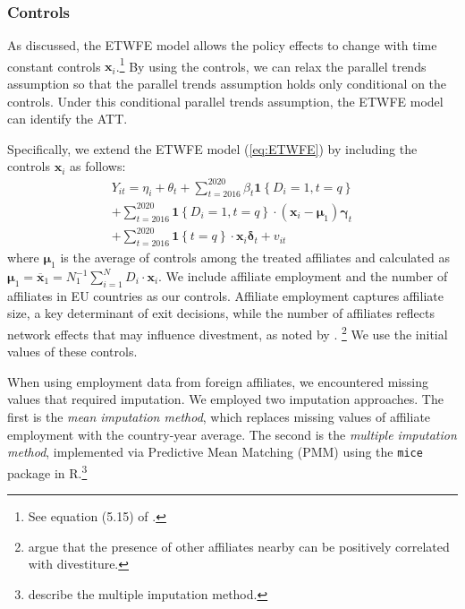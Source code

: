 \documentclass[preprint,11pt,authoryear]{elsarticle}
\begin{document}
{\renewcommand\normalsize{\scriptsize}%
\normalsize 

}




\subsubsection*{Controls}

As \cite{wooldridge2021two} discussed, the ETWFE model allows the policy effects to change with time constant controls $\mathbf{x}_{i}$.\footnote{See equation (5.15) of \cite{wooldridge2021two}.} 
By using the controls, we can relax the parallel trends assumption so that the parallel trends assumption holds only conditional on the controls. 
Under this conditional parallel trends assumption, the ETWFE model can identify the ATT.

Specifically, we extend the ETWFE model (\ref{eq:ETWFE}) by including the controls $\mathbf{x}_{i}$ as follows: 
\begin{equation} \label{eq:ETWFE2} %
\begin{array}{l}
Y_{i t}=
\eta_{i}
+
\theta_{t}
+
\sum_{t=2016}^{2020} 
\beta_{t}
\mathbf{1}\left\{D_{i}=1, t=q\right\} \\
+
\sum_{t=2016}^{2020} 
\mathbf{1}\left\{D_{i}=1, t=q\right\} 
\cdot\left(\mathbf{x}_{i}-\boldsymbol{\mu}_{1}\right)
\boldsymbol{\gamma}_{t}
\\
+
\sum_{t=2016}^{2020} 
\mathbf{1}\left\{t=q\right\} 
\cdot \mathbf{x}_{i}
\boldsymbol{\delta}_{t}
+ v_{i t}
\end{array}
\end{equation} 
where 
$\boldsymbol{\mu}_{1}$ is the average of controls among the treated affiliates and calculated as $\boldsymbol{\mu}_{1}=\overline{\mathbf{x}}_{1}=N_{1}^{-1} \sum_{i=1}^{N} D_{i} \cdot \mathbf{x}_{i}$. 
We include affiliate employment and the number of affiliates in EU countries as our controls.
Affiliate employment captures affiliate size, a key determinant of exit decisions, while the number of affiliates reflects network effects that may influence divestment, as noted by \citet{norback2015}.
\footnote{\citet{norback2015} argue that the presence of other affiliates nearby can be positively correlated with divestiture.}
We use the initial values of these controls.


When using employment data from foreign affiliates, we encountered missing values that required imputation.
We employed two imputation approaches. The first is the \textit{mean imputation method}, which replaces missing values of affiliate employment with the country-year average.  
The second is the \textit{multiple imputation method}, implemented via Predictive Mean Matching (PMM) using the \texttt{mice} package in R.\footnote{\cite{hayati2015rise} describe the multiple imputation method.}
\end{document}
